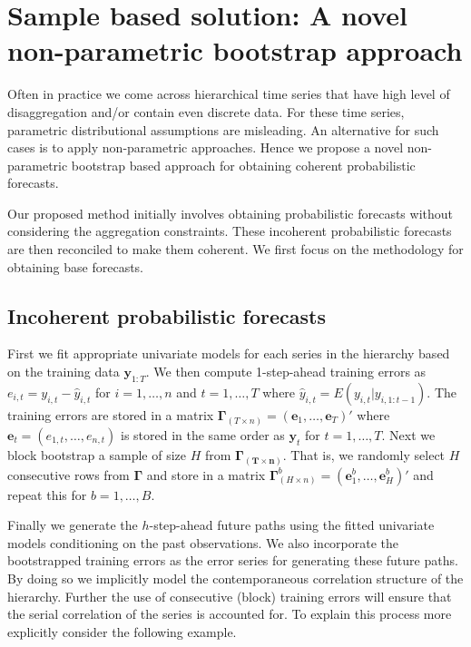 \documentclass[12pt]{article}
\theoremstyle{definition}
\begin{document}
\section{Sample based solution: A novel non-parametric bootstrap approach}\label{sec:non-para}

Often in practice we come across hierarchical time series that have high level of disaggregation and/or contain even discrete data. For these time series, parametric distributional assumptions are misleading. An alternative for such cases is to apply non-parametric approaches. Hence we propose a novel non-parametric bootstrap based approach for obtaining coherent probabilistic forecasts.

Our proposed method initially involves obtaining probabilistic forecasts without considering the aggregation constraints. These incoherent probabilistic forecasts are then reconciled to make them coherent. We first focus on the methodology for obtaining base forecasts.

\subsection{Incoherent probabilistic forecasts} \label{Subsec:Incoherent_samplePaths}
First we fit appropriate univariate models for each series in the hierarchy based on the training data $\bm{y}_{1:T}$. We then compute 1-step-ahead training errors as $e_{i,t} = y_{i,t} - \hat{y}_{i,t}$ for $i=1,\dots,n$ and $t = 1,\dots,T$ where $\hat{y}_{i,t} = E(y_{i,t}|y_{i,1:t-1})$. The training errors are stored in a matrix $\bm{\Gamma}_{(T \times n)} = (\bm{e}_1,\dots,\bm{e}_T)'$ where $\bm{e}_t = (e_{1,t},\dots,e_{n,t})$ is stored in the same order as $\bm{y}_t$ for $t=1,\dots,T$. Next we block bootstrap a sample of size $H$ from $\bm{\Gamma_{(T \times n)}}$. That is, we randomly select $H$ consecutive rows from $\bm{\Gamma}$ and store in a matrix $\bm{\Gamma}^b_{(H \times n)} = (\bm{e}^b_1,\dots,\bm{e}^b_H)'$ and repeat this for $b = 1,\dots,B$.

Finally we generate the $h$-step-ahead future paths using the fitted univariate models conditioning on the past observations. We also incorporate the bootstrapped training errors as the error series for generating these future paths. By doing so we implicitly model the contemporaneous correlation structure of the hierarchy. Further the use of consecutive (block) training errors will ensure that the serial correlation of the series is accounted for. To explain this process more explicitly consider the following example.
\end{document}
